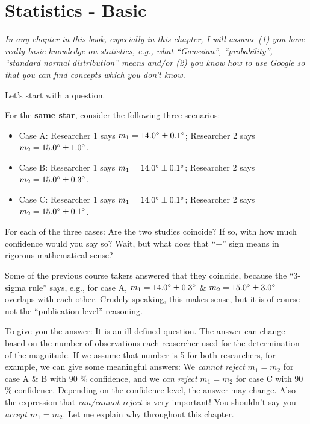 \chapter{Statistics - Basic}

\textit{In any chapter in this book, especially in this chapter, I will assume (1) you have really basic knowledge on statistics, e.g., what ``Gaussian'', ``probability'', ``standard normal distribution'' means and/or (2) you know how to use Google so that you can find concepts which you don't know.}

Let's start with a question. 
\begin{ex}
  For the \textbf{same star}, consider the following three scenarios:
  \begin{itemize}
    \item Case A: Researcher 1 says $ m_1 =  \m{14.0} \pm \m{0.1} $; Researcher 2 says $ m_2 = \m{15.0} \pm \m{1.0} $.
    \item Case B: Researcher 1 says $ m_1 =  \m{14.0} \pm \m{0.1} $; Researcher 2 says $ m_2 = \m{15.0} \pm \m{0.3} $.
    \item Case C: Researcher 1 says $ m_1 =  \m{14.0} \pm \m{0.1} $; Researcher 2 says $ m_2 = \m{15.0} \pm \m{0.1} $.
  \end{itemize}
  For each of the three cases: Are the two studies coincide? If so, with how much confidence would you say so? Wait, but what does that ``$ \pm $'' sign means in rigorous mathematical sense?
\end{ex}

Some of the previous course takers answered that they coincide, because the ``3-sigma rule'' says, e.g., for case A, $ m_1 = \m{14.0} \pm \m{0.3} $ \& $ m_2 = \m{15.0} \pm \m{3.0} $ overlaps with each other. Crudely speaking, this makes sense, but it is of course not the ``publication level'' reasoning.

To give you the answer: It is an ill-defined question. The answer can change based on the number of observations each reasercher used for the determination of the magnitude. If we assume that number is 5 for both researchers, for example, we can give some meaningful answers: We \textit{cannot reject} $ m_1 = m_2 $ for case A \& B with 90 \% confidence, and we \textit{can reject} $ m_1 = m_2 $ for case C with 90 \% confidence. Depending on the confidence level, the answer may change. Also the expression that \textit{can/cannot reject} is very important! You shouldn't say you \textit{accept $ m_1 = m_2 $}. Let me explain why throughout this chapter.


